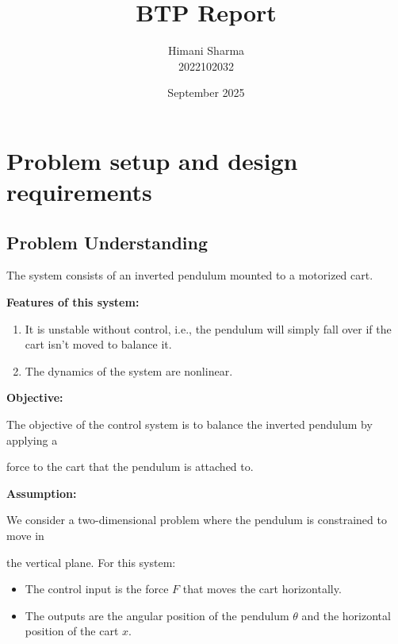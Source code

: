 \documentclass[12pt]{article}
\title{\textbf{BTP Report}}
\author{
  Himani Sharma \\ \small 2022102032
}
\date{September 2025}
\begin{document}
\maketitle

\tableofcontents
\newpage


\section{Problem setup and design requirements}

\subsection{Problem Understanding}
The system consists of an inverted pendulum mounted to a motorized cart. 

\vspace{2mm}

\textbf{Features of this system:}
\begin{enumerate}
    \item It is unstable without control, i.e., the pendulum will simply fall over 
          if the cart isn't moved to balance it.
    \vspace{-2mm}
    \item The dynamics of the system are nonlinear.
\end{enumerate}

\vspace{2mm} %

\textbf{Objective:} 

The objective of the control system is to balance the inverted pendulum 
by applying a 

force to the cart that the pendulum is attached to.

\vspace{2mm}

\textbf{Assumption:} 

We consider a two-dimensional problem where the pendulum is constrained 
to move in 

the vertical plane. For this system: 
\begin{itemize}
    \item The control input is the force $F$ that moves the cart horizontally.
    \item The outputs are the angular position of the pendulum $\theta$ 
          and the horizontal position of the cart $x$.
\end{itemize}
\end{document}
